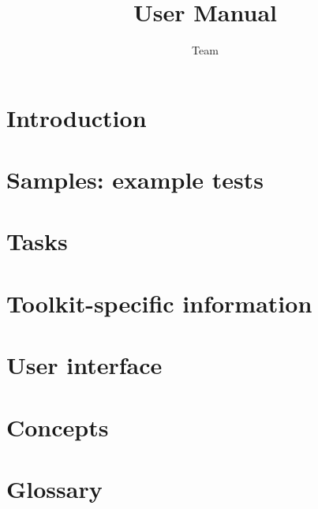 
\title{\app{} User Manual}
\author*{\app{} Team}{}
\maketitle



\tableofcontents
\renewcommand{\bxcomment}[2]{}%
\clearpage
\chapter{Introduction}
\label{Introduction}


\clearpage
\chapter{Samples: example tests}
\label{Samples}


\clearpage
 \chapter{Tasks}
 \label{Tasks}


\clearpage
\chapter{Toolkit-specific information}
\label{Toolkit}


\clearpage
\chapter{User interface}
\label{ChapterUserInterface}


\clearpage
\chapter{Concepts}
\label{Concepts}


\clearpage
\chapter{Glossary}
\label{Glossary}


\clearpage
\printindex
